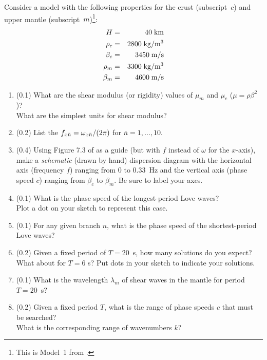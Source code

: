 \documentclass[11pt,titlepage,fleqn]{article}
\begin{document}
\begin{enumerate}
Consider a model with the following properties for the crust (subscript~$c$) and upper mantle (subscript~$m$)\footnote{This is Model~1 from .}:
%
\begin{eqnarray*}
H &=& 40\;{\rm km}
\\
\rho_c &=& 2800 \;{\rm kg/m^3}
\\
\beta_c &=& 3450 \;{\rm m/s}
\\
\rho_m &=& 3300 \;{\rm kg/m^3}
\\
\beta_m &=& 4600 \;{\rm m/s}
\end{eqnarray*}

\begin{enumerate}
\item (0.1) What are the shear modulus (or rigidity) values of $\mu_m$ and $\mu_c$ ($\mu = \rho\beta^2$)? \\
What are the simplest units for shear modulus?

\item (0.2) List the ${f}_{x\bar{n}} = {\omega}_{x\bar{n}}/(2\pi)$ for $\bar{n}=1,\ldots,10$.

\item (0.4) Using Figure 7.3 of \citet{AkiRichardsE2} as a guide (but with $f$ instead of $\omega$ for the $x$-axis), make a {\em schematic} (\ie drawn by hand) dispersion diagram with the horizontal axis (frequency $f$) ranging from 0 to 0.33~Hz and the vertical axis (phase speed $c$) ranging from $\beta_c$ to $\beta_m$. Be sure to label your axes.

\item (0.1) What is the phase speed of the longest-period Love waves? \\
Plot a dot on your sketch to represent this case.

\item (0.1) For any given branch $n$, what is the phase speed of the shortest-period Love waves?

\item (0.2) Given a fixed period of $T = 20$~s, how many solutions do you expect? \\
What about for $T = 6$ s? Put dots in your sketch to indicate your solutions.

\item (0.1) What is the wavelength $\lambda_m$ of shear waves in the mantle for period $T = 20$~s?

\item (0.2) Given a fixed period $T$, what is the range of phase speeds $c$ that must be searched? \\
What is the corresponding range of wavenumbers $k$?


\end{enumerate}
\end{enumerate}
\end{document}
